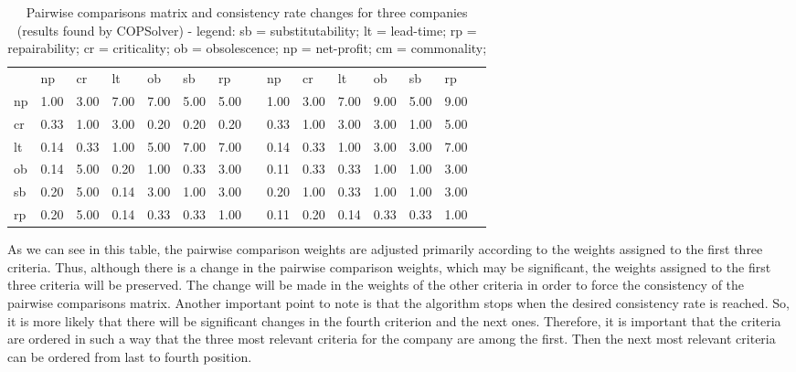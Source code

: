 \documentclass[authoryear,manuscript,12pt]{elsarticle}
\begin{document}
\begin{table}[h!]
\begin{center}
\begin{small}
\begin{tabular}[l]{p{0.4cm} p{0.5cm} p{0.5cm} p{0.5cm} p{0.5cm} p{0.5cm} p{0.5cm} p{0.5cm} | p{0.5cm} p{0.5cm} p{0.5cm} p{0.5cm} p{0.5cm} p{0.5cm} p{0.5cm}}
   & np & cr & lt & ob & sb & rp & & np & cr & lt & ob & sb & rp & \\
np & 1.00 & 3.00 & 7.00 & \cellcolor[HTML]{ACE600} 7.00 & 5.00 & \cellcolor[HTML]{ACE600} 5.00 & & 1.00 & 3.00 & 7.00 & \cellcolor[HTML]{ACE600} 9.00 & 5.00 & \cellcolor[HTML]{ACE600} 9.00 \\
cr & 0.33 & 1.00 & 3.00 & \cellcolor[HTML]{ACE600} 0.20 & \cellcolor[HTML]{ACE600} 0.20 & \cellcolor[HTML]{ACE600} 0.20 & & 0.33 & 1.00 & 3.00 & \cellcolor[HTML]{ACE600} 3.00 & \cellcolor[HTML]{ACE600} 1.00 & \cellcolor[HTML]{ACE600} 5.00 \\
lt & 0.14 & 0.33 & 1.00 & \cellcolor[HTML]{ACE600} 5.00 & \cellcolor[HTML]{ACE600} 7.00 & 7.00 & & 0.14 & 0.33 & 1.00 & \cellcolor[HTML]{ACE600} 3.00 & \cellcolor[HTML]{ACE600} 3.00 & 7.00 \\
ob & \cellcolor[HTML]{ACE600} 0.14 & \cellcolor[HTML]{ACE600} 5.00 & \cellcolor[HTML]{ACE600} 0.20 & 1.00 & \cellcolor[HTML]{ACE600} 0.33 & 3.00 & & \cellcolor[HTML]{ACE600} 0.11 & \cellcolor[HTML]{ACE600} 0.33 & \cellcolor[HTML]{ACE600} 0.33 & 1.00 & \cellcolor[HTML]{ACE600} 1.00 & 3.00 \\
sb & 0.20 & \cellcolor[HTML]{ACE600} 5.00 & \cellcolor[HTML]{ACE600} 0.14 & \cellcolor[HTML]{ACE600} 3.00 & 1.00 & 3.00 & & 0.20 & \cellcolor[HTML]{ACE600} 1.00 & \cellcolor[HTML]{ACE600} 0.33 & \cellcolor[HTML]{ACE600} 1.00 & 1.00 & 3.00 \\
rp & \cellcolor[HTML]{ACE600} 0.20 & \cellcolor[HTML]{ACE600} 5.00 & 0.14 & 0.33 & 0.33 & 1.00 & & \cellcolor[HTML]{ACE600} 0.11 & \cellcolor[HTML]{ACE600} 0.20 & 0.14 & 0.33 & 0.33 & 1.00
\end{tabular}
\caption{Pairwise comparisons matrix and consistency rate changes for three companies (results found by COPSolver) - legend: sb = substitutability; lt = lead-time; rp = repairability; cr = criticality; ob = obsolescence; np = net-profit; cm = commonality;}
\label{tab:pairwiseMatrix}
\end{small}
\end{center}
\end{table} 

As we can see in this table, the pairwise comparison weights are adjusted primarily according to the  weights assigned to the first three criteria. Thus, although there is a change in the pairwise comparison weights, which may be significant, the weights assigned to the first three criteria will be preserved. The change will be made in the weights of the other criteria in order to force the consistency of the pairwise comparisons matrix. Another important point to note is that the algorithm stops when the desired consistency rate is reached. So, it is more likely that there will be significant changes in the fourth criterion and the next ones. Therefore, it is important that the criteria are ordered in such a way that the three most relevant criteria for the company are among the first. Then the next most relevant criteria can be ordered from last to fourth position.
\end{document}
